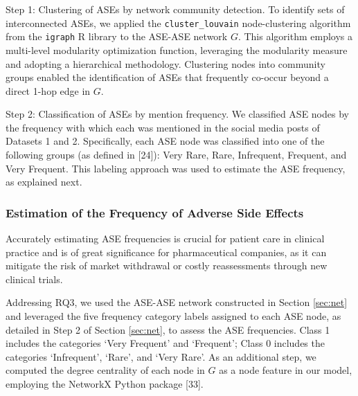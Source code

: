 \documentclass[referee,bst/sn-basic]{sn-jnl}%
\begin{document}
{Step 1: Clustering of ASEs by network community detection.}
To identify sets of interconnected ASEs, we applied the \texttt{cluster\_louvain} node-clustering algorithm from the \texttt{igraph} R library to the ASE-ASE network $G$. 
This algorithm employs a multi-level modularity optimization function, leveraging the modularity measure and adopting a hierarchical methodology.
Clustering nodes into community groups enabled the identification of ASEs that frequently co-occur beyond a direct 1-hop edge in $G$.

{Step 2: Classification of ASEs by mention frequency.}
We classified ASE nodes by the frequency with which each was mentioned in the social media posts of Datasets 1 and 2. 
Specifically, each ASE node was classified into one of the following groups (as defined in [24]): 
Very Rare, 
Rare, 
Infrequent, 
Frequent, and 
Very Frequent. 
This labeling approach was used to estimate the ASE frequency, as explained next.

\subsubsection{Estimation of the Frequency of Adverse Side Effects}
\label{sec:pred_side_effect_freq}
Accurately estimating ASE frequencies is crucial for patient care in clinical practice and is of great significance for pharmaceutical companies, as it can mitigate the risk of market withdrawal or costly reassessments through new clinical trials.

Addressing RQ3, we used the ASE-ASE network constructed in Section \ref{sec:net} and leveraged the five frequency category labels assigned to each ASE node, as detailed in Step 2 of Section \ref{sec:net}, to assess the ASE frequencies.
Class 1 includes the categories `Very Frequent' and `Frequent';
Class 0 includes the categories `Infrequent', `Rare', and `Very Rare'. 
As an additional step, we computed the degree centrality of each node in $G$ as a node feature in our model, employing the NetworkX Python package [33]. 
\end{document}
